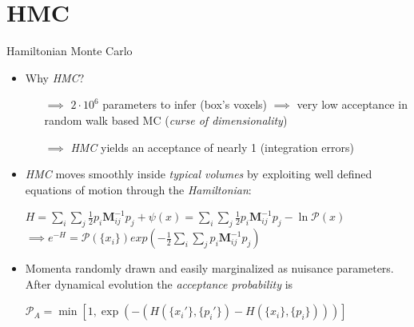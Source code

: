 \documentclass[10pt]{beamer}
\begin{document}
\section[Hamiltonian Monte Carlo]{HMC}

\begin{frame}[fragile]{Hamiltonian Monte Carlo}

\begin{itemize}
   \item Why \textit{HMC}?\pause
   \begin{itemize}
    \item[$\implies$] $2\cdot10^6$ parameters to infer (box's voxels) $\implies$ very low acceptance in random walk based MC (\textit{curse of dimensionality})\pause
    \item[$\implies$] \textit{HMC} yields an acceptance of nearly 1 (integration errors)
    \end{itemize}\pause
    \item \textit{HMC} moves smoothly inside \textit{typical volumes} by exploiting well defined equations of motion through the \textit{Hamiltonian}:
    \begin{center}
        $H=\sum\limits_i\sum\limits_j\frac{1}{2}p_i\textbf{M}_{ij}^{-1}p_j + \psi\left(x\right) = \sum\limits_i\sum\limits_j\frac{1}{2}p_i\textbf{M}_{ij}^{-1}p_j -\ln{\mathcal{P}\left(x\right)} $
         \pause
    $\implies e^{-H}=\mathcal{P}\left(\{x_i\}\right)exp\left(-\frac{1}{2}\sum\limits_i\sum\limits_j p_i\textbf{M}_{ij}^{-1}p_j \right)$\end{center}\pause
    \item Momenta randomly drawn and easily marginalized as nuisance parameters. After dynamical evolution the \textit{acceptance probability} is
    \begin{center}
            \begingroup\makeatletter{}\check@mathfonts

    $\mathcal{P}_A = \min \left[1,\exp{\left(-\left(H\left(\{x_i'\},\{p_i'\}\right)-H\left(\{x_i\},\{p_i\}\right)\right)\right)}\right]$
    \endgroup
\end{center}
\end{itemize}



 
\end{frame}
\end{document}
